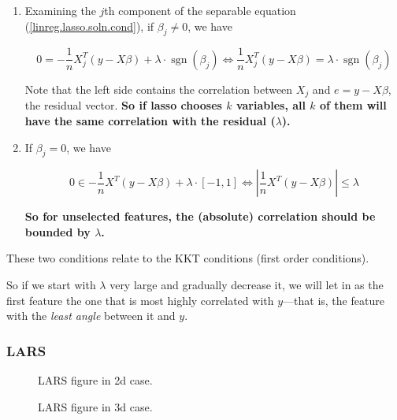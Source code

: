 \begin{remark}
\begin{enumerate}[(1)]
\item Examining the \(j\)th component of the separable equation (\ref{linreg.lasso.soln.cond}), if \(\beta_j \neq 0\), we have

\[
0 = -\frac{1}{n} X_j^T(y - X \beta) + \lambda \cdot
\operatorname{sgn}(\beta_j) \iff \frac{1}{n} X_j^T(y - X \beta) = \lambda \cdot
\operatorname{sgn}(\beta_j) 
\]

Note that the left side contains the correlation between \(X_j\) and \(e = y - X \beta\), the residual vector. \textbf{So if lasso chooses \(k\) variables, all \(k\) of them will have the same correlation with the residual (\(\lambda\)).}

\item If \(\beta_j =0\), we have

\[
0 \in - \frac{1}{n} X^T(y - X \beta) + \lambda \cdot 
[-1, 1]  \iff \left|  \frac{1}{n} X^T(y - X \beta)  \right| \leq \lambda
\]

\textbf{So for unselected features, the (absolute) correlation should be bounded by \(\lambda\).}

\end{enumerate}

\end{remark}

These two conditions relate to the KKT conditions (first order conditions).

So if we start with \(\lambda\) very large and gradually decrease it, we will let in as the first feature the one that is most highly correlated with \(y\)---that is, the feature with the \textit{least angle} between it and \(y\).


\subsubsection{LARS}

\begin{figure}
\caption{\label{fig:lars_2d} LARS figure in 2d case.}
\end{figure}

\begin{figure}
\caption{\label{fig:lars_3d} LARS figure in 3d case.}
\end{figure}

